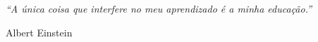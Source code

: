 \begin{epigrafe}
    \textit{``A única coisa que interfere no meu aprendizado é a minha educação.''}
    
    \vspace{0.5cm}
    \hfill Albert Einstein
\end{epigrafe}